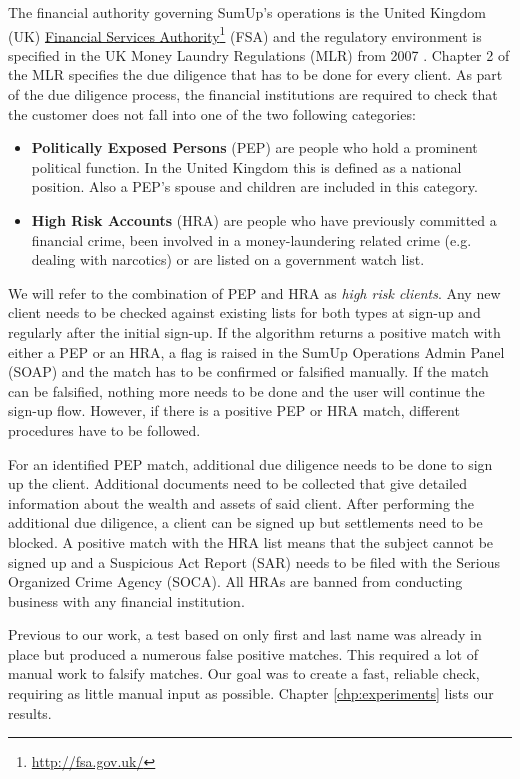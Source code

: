 \documentclass[a4paper, oneside]{csthesis}
\newcommand\fnurl[2]{%
  \href{#2}{#1}\footnote{\url{#2}}%
}
\begin{document}
The financial authority governing SumUp's operations is the United Kingdom (UK) \fnurl{Financial Services Authority}{http://fsa.gov.uk/} (FSA) and the regulatory environment is specified in the UK Money Laundry Regulations (MLR) from 2007 \cite{website:aml-regulations-2007}. Chapter 2 of the MLR specifies the due diligence that has to be done for every client. As part of the due diligence process, the financial institutions are required to check that the customer does not fall into one of the two following categories:

\begin{itemize}
\item \textbf{Politically Exposed Persons} (PEP) are people who hold a prominent political function. In the United Kingdom this is defined as a national position. Also a PEP's spouse and children are included in this category.

\item \textbf{High Risk Accounts} (HRA) are people who have previously committed a financial crime, been involved in a money-laundering related crime (e.g. dealing with narcotics) or are listed on a government watch list.

\end{itemize}

We will refer to the combination of PEP and HRA as \emph{high risk clients}. Any new client needs to be checked against existing lists for both types at sign-up and regularly after the initial sign-up.
If the algorithm returns a positive match with either a PEP or an HRA, a flag is raised in the SumUp Operations Admin Panel (SOAP) and the match has to be confirmed or falsified manually. If the match can be falsified, nothing more needs to be done and the user will continue the sign-up flow. However, if there is a positive PEP or HRA match, different procedures have to be followed.

For an identified PEP match, additional due diligence needs to be done to sign up the client. Additional documents need to be collected that give detailed information about the wealth and assets of said client. After performing the additional due diligence, a client can be signed up but settlements need to be blocked.
A positive match with the HRA list means that the subject cannot be signed up and a Suspicious Act Report (SAR) needs to be filed with the Serious Organized Crime Agency (SOCA). All HRAs are banned from conducting business with any financial institution.

Previous to our work, a test based on only first and last name was already in place but produced a numerous false positive matches. This required a lot of manual work to falsify matches. Our goal was to create a fast, reliable check, requiring as little manual input as possible. Chapter \ref{chp:experiments} lists our results.
\end{document}
